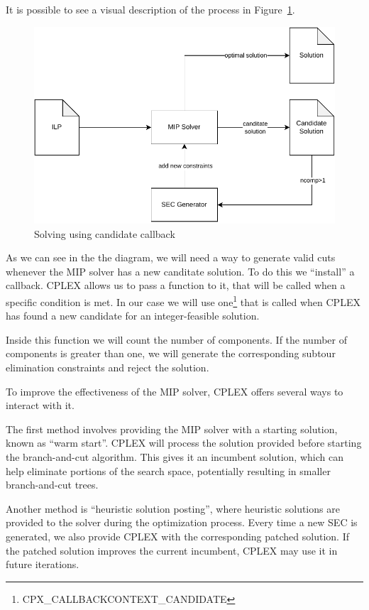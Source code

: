 \documentclass{article}
\begin{document}
It is possible to see a visual description of the process in
Figure~\ref{fig:callback}.

\begin{figure}[ht]
        \caption{Solving using candidate callback}
        \label{fig:callback}
        \centering
        \includegraphics[width=340pt]{assets/callback.drawio.pdf}
\end{figure}

As we can see in the the diagram, we will need a way to generate valid cuts
whenever the MIP solver has a new canditate solution. To do this we ``install''
a callback. CPLEX allows us to pass a function to it, that will be called when
a specific condition is met. In our case we will use one\footnote{CPX\_CALLBACKCONTEXT\_CANDIDATE} that is called when CPLEX
has found a new candidate for an integer-feasible solution.

Inside this function we will count the number of components. If the number of
components is greater than one, we will generate the corresponding subtour
elimination constraints and reject the solution.

To improve the effectiveness of the MIP solver, CPLEX offers several
ways to interact with it.

The first method involves providing the MIP solver with a starting solution, known as ``warm start''.
CPLEX will process the solution provided before starting the branch-and-cut algorithm.
This gives it an incumbent solution, which can help eliminate portions
of the search space, potentially resulting in smaller branch-and-cut trees.

Another method is ``heuristic solution posting'', where heuristic solutions are provided to the solver
during the optimization process. Every time a new SEC is generated, we also provide CPLEX with
the corresponding patched solution. If the patched solution improves the current incumbent, CPLEX
may use it in future iterations.
\end{document}
